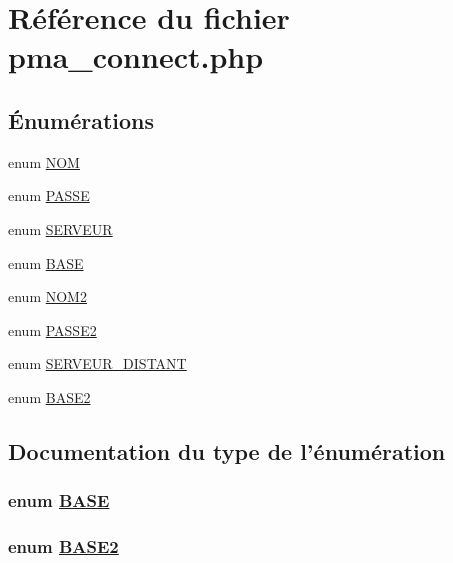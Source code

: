 \hypertarget{pma__connect_8php}{
\section{R\'{e}f\'{e}rence du fichier pma\_\-connect.php}
\label{pma__connect_8php}
}
\subsection*{\'{E}num\'{e}rations}
\begin{CompactItemize}
\item 
enum \hyperlink{pma__connect_8php_a0}{NOM} 
\item 
enum \hyperlink{pma__connect_8php_a1}{PASSE} 
\item 
enum \hyperlink{pma__connect_8php_a2}{SERVEUR} 
\item 
enum \hyperlink{pma__connect_8php_a3}{BASE} 
\item 
enum \hyperlink{pma__connect_8php_a4}{NOM2} 
\item 
enum \hyperlink{pma__connect_8php_a5}{PASSE2} 
\item 
enum \hyperlink{pma__connect_8php_a6}{SERVEUR\_\-DISTANT} 
\item 
enum \hyperlink{pma__connect_8php_a7}{BASE2} 
\end{CompactItemize}


\subsection{Documentation du type de l'\'{e}num\'{e}ration}
\hypertarget{pma__connect_8php_a3}{
\subsubsection[BASE]{\setlength{\rightskip}{0pt plus 5cm}enum \hyperlink{pma__connect_8php_a3}{BASE}}}
\label{pma__connect_8php_a3}


\hypertarget{pma__connect_8php_a7}{
\subsubsection[BASE2]{\setlength{\rightskip}{0pt plus 5cm}enum \hyperlink{pma__connect_8php_a7}{BASE2}}}
\label{pma__connect_8php_a7}


